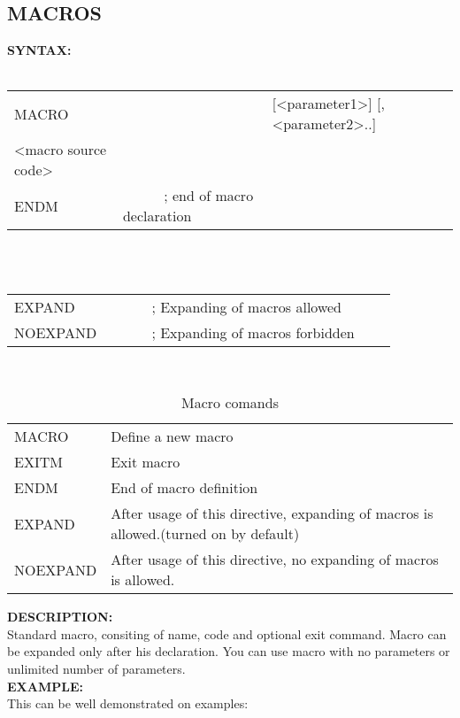 {                \subsection{MACROS}
                \textbf{SYNTAX:}\\
                \\ {
                    \texttt{}
                        \begin{tabular}[h!]{llll}
                            { \color{highlight_directive} MACRO } & \verb'     ' &
                            { \color{highlight_constant} [<parameter1>]  [,<parameter2>..] }\\
                            { \color{highlight_symbol} <macro source code> }\\
                            { \color{highlight_directive} ENDM } &  \verb'     ' { \color{highlight_comment} ; end of macro declaration  }
                        \end{tabular}
                    }\\
                \\ {
                    \texttt{}
                        \begin{tabular}[h!]{llll}
                            { \color{highlight_directive} EXPAND } &  \verb'     ' { \color{highlight_comment} ; Expanding of macros allowed  }\\
                            { \color{highlight_directive} NOEXPAND } &  \verb'     ' { \color{highlight_comment} ; Expanding of macros forbidden  }
                        \end{tabular}
                    }\\
                \begin{table}[h!]
                    \begin{tabular}{|ll|}
                            \hline
                            MACRO      & Define a new macro \\
                            EXITM      & Exit macro  \\
                            ENDM       & End of macro definition \\
                            EXPAND     & After usage of this directive, expanding of macros is allowed.(turned on by default)\\
                            NOEXPAND   & After usage of this directive, no expanding of macros is allowed.\\
                            \hline
                    \end{tabular}
                    \caption{Macro comands}
                \end{table}
                \textbf{DESCRIPTION:}\\
                Standard macro, consiting of name, code and optional exit command. Macro can be expanded only after his declaration. You can use macro
                with no parameters  or unlimited number of parameters.\\
                \textbf{EXAMPLE:}\\
                This can be well demonstrated on examples:

}
